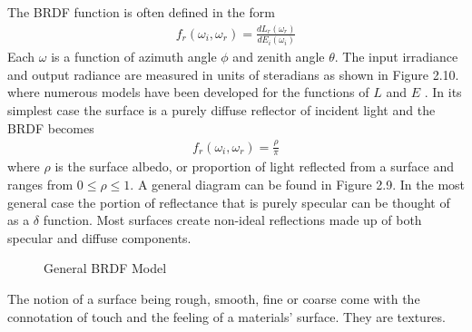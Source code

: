 The BRDF function is often defined in the form
%
\begin{align}
    f_r(\omega_i, \omega_r) = \frac{dL_r(\omega_r)}{dE_i(\omega_i)}
\end{align}
%
Each $\omega$ is a function of azimuth angle $\phi$ and zenith angle $\theta$. The input irradiance and output radiance are measured in units of steradians as shown in Figure 2.10.
where numerous models have been developed for the functions of $L$ and $E$ \cite{sparrow}\cite{brdfoverview}.  In its simplest case the surface is a purely diffuse reflector of incident light and the BRDF becomes
%
\begin{align}
    f_r(\omega_i, \omega_r) = \frac{\rho}{\pi}
\end{align}
%
where $\rho$ is the surface albedo, or proportion of light reflected from a surface \cite{nicodemus} and ranges from $0\leq\rho\leq1$.  A general diagram can be found in Figure 2.9.  In the most general case the portion of reflectance that is purely specular can be thought of as a $\delta$ function.  Most surfaces create non-ideal reflections made up of both specular and diffuse components.
%
\begin{figure}
    \begin{center}
    \end{center}
    \caption{General BRDF Model}
    \label{fig:scattering}
\end{figure}
%
The notion of a surface being rough, smooth, fine or coarse come with the connotation of touch and the feeling of a materials' surface.  They are textures.
